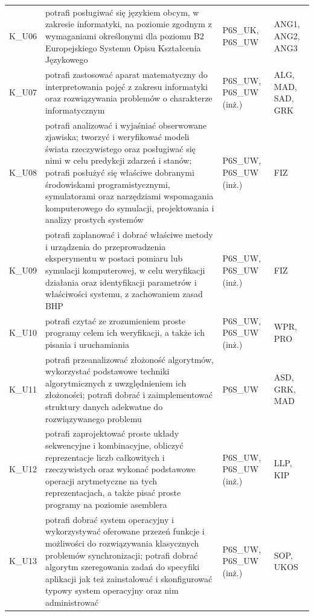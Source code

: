 \documentclass[12pt,a4paper]{article}
\begin{document}
{\begin{longtable}{m{1cm}m{8.8cm}m{2.1cm}m{2.5cm}}
\rowcolor{tableRowAlt} K\_U06 & potrafi posługiwać się językiem obcym, w zakresie informatyki, na poziomie zgodnym z wymaganiami określonymi dla poziomu B2 Europejskiego Systemu Opisu Kształcenia Językowego & {\scriptsize P6S\_UK, P6S\_UW} & {\scriptsize ANG1, ANG2, ANG3} \\
\rowcolor{tableRowLight} K\_U07 & potrafi zastosować aparat matematyczny do interpretowania pojęć z zakresu informatyki oraz rozwiązywania problemów o charakterze informatycznym & {\scriptsize P6S\_UW, P6S\_UW {\scriptsize (inż.)}} & {\scriptsize ALG, MAD, SAD, GRK} \\
\rowcolor{tableRowAlt} K\_U08 & potrafi analizować i wyjaśniać obserwowane zjawiska; tworzyć i weryfikować modeli świata rzeczywistego oraz posługiwać się nimi w celu predykcji zdarzeń i stanów; potrafi posłużyć się właściwe dobranymi środowiskami programistycznymi, symulatorami oraz narzędziami wspomagania komputerowego do symulacji, projektowania i analizy prostych systemów & {\scriptsize P6S\_UW, P6S\_UW {\scriptsize (inż.)}} & {\scriptsize FIZ} \\
\rowcolor{tableRowLight} K\_U09 & potrafi zaplanować i dobrać właściwe metody i urządzenia do przeprowadzenia eksperymentu w postaci pomiaru lub symulacji komputerowej, w celu weryfikacji działania oraz identyfikacji parametrów i właściwości systemu, z zachowaniem zasad BHP & {\scriptsize P6S\_UW, P6S\_UW {\scriptsize (inż.)}} & {\scriptsize FIZ} \\
\rowcolor{tableRowAlt} K\_U10 & potrafi czytać ze zrozumieniem proste programy celem ich weryfikacji, a także ich pisania i uruchamiania & {\scriptsize P6S\_UW, P6S\_UW {\scriptsize (inż.)}} & {\scriptsize WPR, PRO} \\
\rowcolor{tableRowLight} K\_U11 & potrafi przeanalizować złożoność algorytmów, wykorzystać podstawowe techniki algorytmicznych z uwzględnieniem ich złożoności; potrafi dobrać i zaimplementować struktury danych adekwatne do rozwiązywanego problemu & {\scriptsize P6S\_UW} & {\scriptsize ASD, GRK, MAD} \\
\rowcolor{tableRowAlt} K\_U12 & potrafi zaprojektować proste układy sekwencyjne i kombinacyjne, obliczyć reprezentacje liczb całkowitych i rzeczywistych oraz wykonać podstawowe operacji arytmetyczne na tych reprezentacjach, a także pisać proste programy na poziomie asemblera & {\scriptsize P6S\_UW, P6S\_UW {\scriptsize (inż.)}} & {\scriptsize LLP, KIP} \\
\rowcolor{tableRowLight} K\_U13 & potrafi dobrać system operacyjny i wykorzystywać oferowane przezeń funkcje i możliwości do rozwiązywania klasycznych problemów synchronizacji; potrafi dobrać algorytm szeregowania zadań do specyfiki aplikacji jak też zainstalować i skonfigurować typowy system operacyjny oraz nim administrować & {\scriptsize P6S\_UW, P6S\_UW {\scriptsize (inż.)}} & {\scriptsize SOP, UKOS} \\

\end{longtable}}
\end{document}
